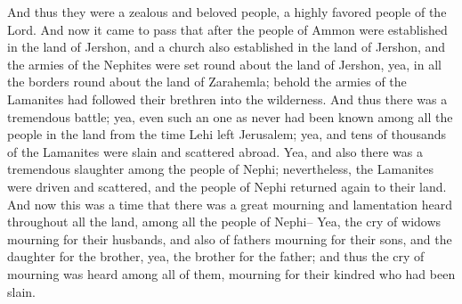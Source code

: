 \bverse \iffalse And thus they were a zealous and beloved people, a highly favored people of the Lord. \fi
And thus they were a zealous and beloved people, a highly favored people of the Lord.
\bchapter
\bverse \iffalse And now it came to pass that after the people of Ammon were established in the land of Jershon, and a church also established in the land of Jershon, and the armies of the Nephites were set round about the land of Jershon, yea, in all the borders round about the land of Zarahemla; behold the armies of the Lamanites had followed their brethren into the wilderness. \fi
And now it came to pass that after the people of Ammon were established in the land of Jershon, and a church also established in the land of Jershon, and the armies of the Nephites were set round about the land of Jershon, yea, in all the borders round about the land of Zarahemla; behold the armies of the Lamanites had followed their brethren into the wilderness.
\bverse \iffalse And thus there was a tremendous battle; yea, even such an one as never had been known among all the people in the land from the time Lehi left Jerusalem; yea, and tens of thousands of the Lamanites were slain and scattered abroad. \fi
And thus there was a tremendous battle; yea, even such an one as never had been known among all the people in the land from the time Lehi left Jerusalem; yea, and tens of thousands of the Lamanites were slain and scattered abroad.
\bverse \iffalse Yea, and also there was a tremendous slaughter among the people of Nephi; nevertheless, the Lamanites were driven and scattered, and the people of Nephi returned again to their land. \fi
Yea, and also there was a tremendous slaughter among the people of Nephi; nevertheless, the Lamanites were driven and scattered, and the people of Nephi returned again to their land.
\bverse \iffalse And now this was a time that there was a great mourning and lamentation heard throughout all the land, among all the people of Nephi-- \fi
And now this was a time that there was a great mourning and lamentation heard throughout all the land, among all the people of Nephi--
\bverse \iffalse Yea, the cry of widows mourning for their husbands, and also of fathers mourning for their sons, and the daughter for the brother, yea, the brother for the father; and thus the cry of mourning was heard among all of them, mourning for their kindred who had been slain. \fi
Yea, the cry of widows mourning for their husbands, and also of fathers mourning for their sons, and the daughter for the brother, yea, the brother for the father; and thus the cry of mourning was heard among all of them, mourning for their kindred who had been slain.
